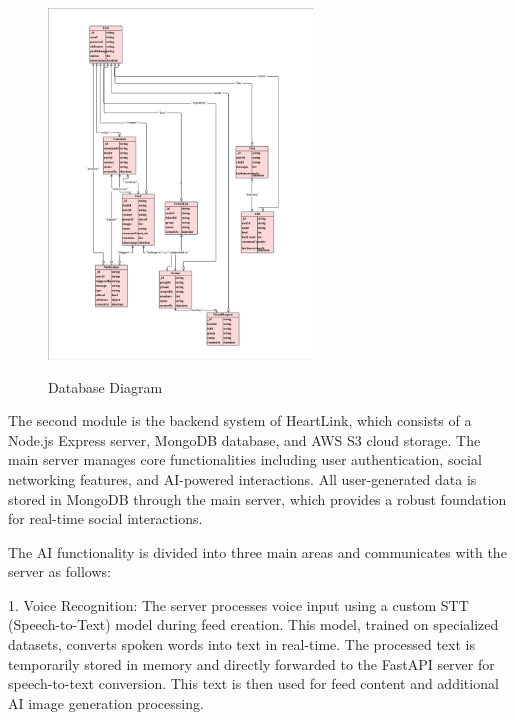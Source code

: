 \documentclass[conference]{IEEEtran}
\begin{document}
            \begin{figure}[htbp]
                \centerline{\includegraphics[width = 7cm, height = 10cm]{Images/struct/db.png}}
                \label{fig}
                \caption{Database Diagram}
            \end{figure}
            The second module is the backend system of HeartLink, which consists of a Node.js Express server, MongoDB database, and AWS S3 cloud storage. The main server manages core functionalities including user authentication, social networking features, and AI-powered interactions. All user-generated data is stored in MongoDB through the main server, which provides a robust foundation for real-time social interactions.
            
            The AI functionality is divided into three main areas and communicates with the server as follows:
            
            1. Voice Recognition: The server processes voice input using a custom STT (Speech-to-Text) model during feed creation. This model, trained on specialized datasets, converts spoken words into text in real-time. The processed text is temporarily stored in memory and directly forwarded to the FastAPI server for speech-to-text conversion. This text is then used for feed content and additional AI image generation processing.
                
\end{document}
